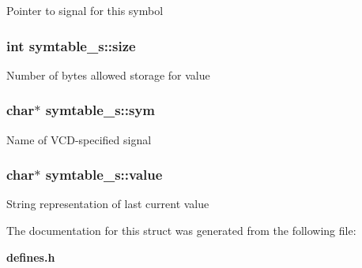 Pointer to signal for this symbol 
\subsubsection{\setlength{\rightskip}{0pt plus 5cm}int symtable\_\-s::size}\label{structsymtable__s_m3}


Number of bytes allowed storage for value 
\subsubsection{\setlength{\rightskip}{0pt plus 5cm}char$\ast$ symtable\_\-s::sym}\label{structsymtable__s_m0}


Name of VCD-specified signal 
\subsubsection{\setlength{\rightskip}{0pt plus 5cm}char$\ast$ symtable\_\-s::value}\label{structsymtable__s_m2}


String representation of last current value 

The documentation for this struct was generated from the following file:\begin{CompactItemize}
\item 
{\bf defines.h}\end{CompactItemize}

